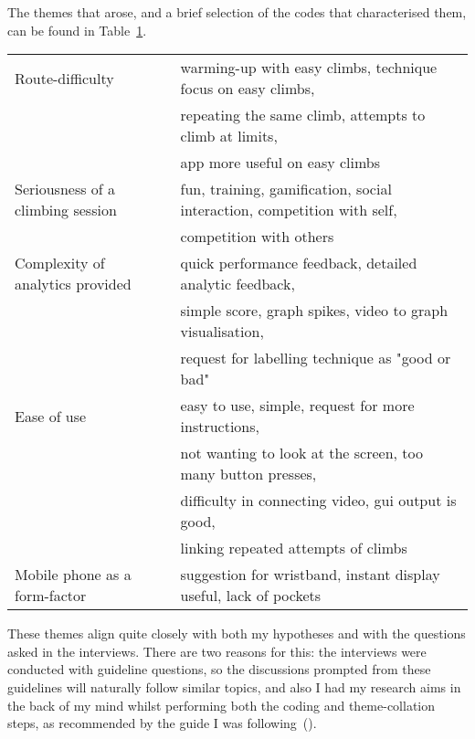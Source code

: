 The themes that arose, and a brief selection of the codes that characterised them, can be found in Table~\ref{tab:themes}.

\begin{table}[h]
\begin{tabular}{|l|l|}
\hline
Route-difficulty     & 
warming-up with easy climbs, technique focus on easy climbs,
\\& repeating the same climb, attempts to climb at limits, 
\\& app more useful on easy climbs
\\ \hline

Seriousness of a climbing session   &  
fun, training, gamification, social interaction, competition with self,
\\& competition with others
\\ \hline

Complexity of analytics provided    & 
quick performance feedback, detailed analytic feedback,
\\& simple score, graph spikes, video to graph visualisation,
\\& request for labelling technique as "good or bad"
\\ \hline

Ease of use                   & 
easy to use, simple, request for more instructions, 
\\& not wanting to look at the screen, too many button presses,
\\& difficulty in connecting video, gui output is good,
\\& linking repeated attempts of climbs
\\ \hline

Mobile phone as a form-factor       & 
suggestion for wristband, instant display useful, lack of pockets
\\ \hline

\end{tabular}
\label{tab:themes}
\end{table}

These themes align quite closely with both my hypotheses and with the questions asked in the interviews.
There are two reasons for this: the interviews were conducted with guideline questions, so the discussions prompted from these guidelines will naturally follow similar topics, and also I had my research aims in the back of my mind whilst performing both the coding and theme-collation steps, as recommended by the guide I was following~(\cite{brauminterviewta}).


